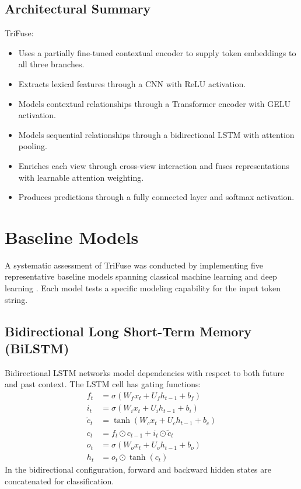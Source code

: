 \subsection{Architectural Summary}

TriFuse:
\begin{itemize}
\item Uses a partially fine-tuned contextual encoder to supply token embeddings to all three branches.
\item Extracts lexical features through a CNN with ReLU activation.
\item Models contextual relationships through a Transformer encoder with GELU activation.
\item Models sequential relationships through a bidirectional LSTM with attention pooling.
\item Enriches each view through cross-view interaction and fuses representations with learnable attention weighting.
\item Produces predictions through a fully connected layer and softmax activation.
\end{itemize}

\section{Baseline Models}

A systematic assessment of TriFuse was conducted by implementing five representative baseline models spanning classical machine learning and deep learning \cite{ref3, ref31, ref5, ref6, ref7, ref8}. Each model tests a specific modeling capability for the input token string.

\subsection{Bidirectional Long Short-Term Memory (BiLSTM)}

Bidirectional LSTM networks model dependencies with respect to both future and past context. The LSTM cell has gating functions:
\begin{equation}
\begin{aligned}
f_t &= \sigma(W_f x_t + U_f h_{t-1} + b_f) \\
i_t &= \sigma(W_i x_t + U_i h_{t-1} + b_i) \\
\tilde{c}_t &= \tanh(W_c x_t + U_c h_{t-1} + b_c) \\
c_t &= f_t \odot c_{t-1} + i_t \odot \tilde{c}_t \\
o_t &= \sigma(W_o x_t + U_o h_{t-1} + b_o) \\
h_t &= o_t \odot \tanh(c_t)
\end{aligned}
\end{equation}
In the bidirectional configuration, forward and backward hidden states are concatenated for classification.

